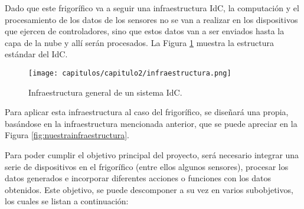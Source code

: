 Dado que este frigorífico va a seguir una infraestructura IdC, la computación y el procesamiento de los datos de los sensores no se van a realizar en los dispositivos que ejercen de controladores, sino que estos datos van a ser enviados hasta la capa de la nube y allí serán procesados. La Figura \ref{fig:infraestructura} muestra la estructura estándar del IdC.

\begin{figure}[h] 
    \centering
    \texttt{[image: capitulos/capitulo2/infraestructura.png]}
    \caption{Infraestructura general de un sistema IdC.}
    \label{fig:infraestructura}
\end{figure}

Para aplicar esta infraestructura al caso del frigorífico, se diseñará una propia, basándose en la infraestructura mencionada anterior, que se puede apreciar en la Figura \ref{fig:nuestrainfraestructura}.

Para poder cumplir el objetivo principal del proyecto, será necesario integrar una serie de dispositivos en el frigorífico (entre ellos algunos sensores), procesar los datos generados e incorporar diferentes acciones o funciones con los datos obtenidos. Este objetivo, se puede descomponer a su vez en varios subobjetivos, los cuales se listan a continuación:

